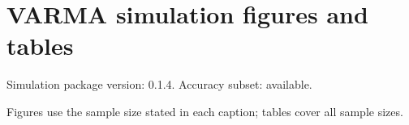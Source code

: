 \documentclass[10pt]{article}
\begin{document}
\section*{VARMA simulation figures and tables}
Simulation package version: 0.1.4. Accuracy subset: available. 
\par\medskip Figures use the sample size stated in each caption; tables cover all sample sizes.
\clearpage
\clearpage
\end{document}
